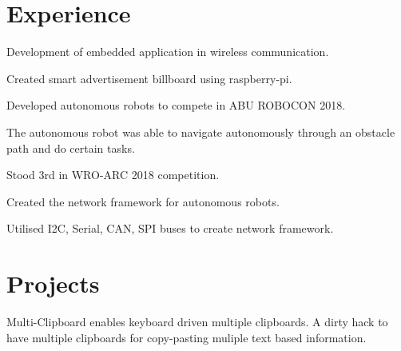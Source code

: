 \documentclass[]{deedy-resume-openfont}
\begin{document}
\begin{minipage}[t][18cm]{0.66\textwidth} 



\section{Experience}
\vspace{\topsep}
\begin{tightemize}
\item Development of embedded application in wireless communication.
\item Created smart advertisement billboard using raspberry-pi.
\end{tightemize}
\sectionsep

\begin{tightemize}
\item Developed autonomous robots to compete in ABU ROBOCON 2018.
\item The autonomous robot was able to navigate autonomously through an obstacle path and do certain tasks.
\end{tightemize}
\sectionsep

\begin{tightemize}
\item Stood 3rd in WRO-ARC 2018 competition.
\item Created the network framework for autonomous robots.
\item Utilised I2C, Serial, CAN, SPI buses to create network framework. 
\end{tightemize}
\sectionsep





\section{Projects}
Multi-Clipboard enables keyboard driven multiple clipboards. A dirty hack to have multiple clipboards for copy-pasting muliple text based information.
\sectionsep


\end{minipage}
\end{document}
